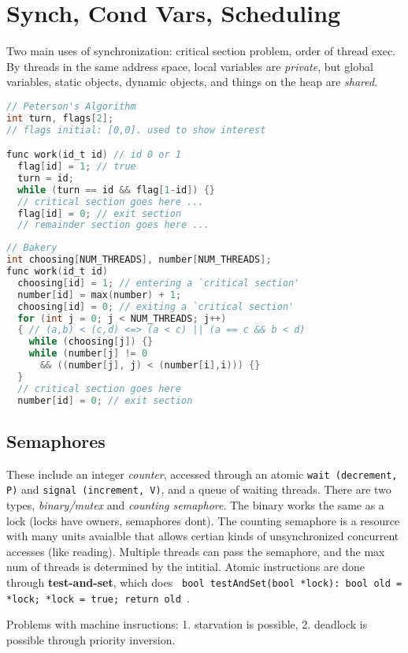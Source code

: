 \section{Synch, Cond Vars, Scheduling}
Two main uses of synchronization: critical section problem, order of thread exec.
By threads in the same address space, local variables are \textit{private}, but
global variables, static objects, dynamic objects, and things on the heap are
\textit{shared}.
\begin{lstlisting}[basicstyle=\tiny,language=c]
// Peterson's Algorithm
int turn, flags[2];
// flags initial: [0,0]. used to show interest

func work(id_t id) // id 0 or 1
  flag[id] = 1; // true
  turn = id;
  while (turn == id && flag[1-id]) {} 
  // critical section goes here ...
  flag[id] = 0; // exit section
  // remainder section goes here ...
\end{lstlisting}
\begin{lstlisting}[basicstyle=\tiny, language=c]
// Bakery
int choosing[NUM_THREADS], number[NUM_THREADS];
func work(id_t id)
  choosing[id] = 1; // entering a `critical section'
  number[id] = max(number) + 1;
  choosing[id] = 0; // exiting a `critical section'
  for (int j = 0; j < NUM_THREADS; j++)
  { // (a,b) < (c,d) <=> (a < c) || (a == c && b < d)
    while (choosing[j]) {}   
    while (number[j] != 0 
      && ((number[j], j) < (number[i],i))) {}
  }
  // critical section goes here
  number[id] = 0; // exit section
\end{lstlisting}

\subsection*{Semaphores}
These include an integer \textit{counter}, accessed through an atomic
{\tt wait (decrement, P)} and {\tt signal (increment, V)}, and a queue of
waiting threads. There are two types, \textit{binary/mutex} and
\textit{counting semaphore}. The binary works the same as a lock (locks have
owners, semaphores dont). The counting
semaphore is a resource with many units avaialble that allows certian kinds of
unsynchronized concurrent accesses (like reading). Multiple threads can pass
the semaphore, and the max num of threads is determined by the intitial. Atomic
instructions are done through \textbf{test-and-set}, which does
{\tt 
bool testAndSet(bool *lock): bool old = *lock; *lock = true; return old
}.

Problems with machine insructions: 1. starvation is possible, 2. deadlock is
possible through priority inversion.


